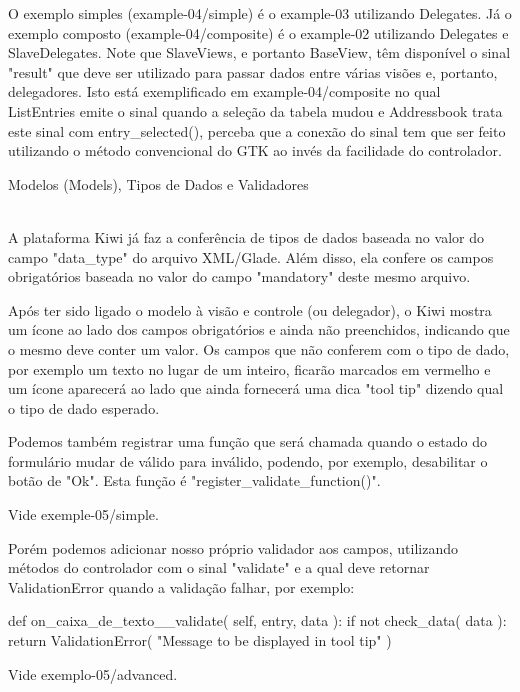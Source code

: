 O exemplo simples (example-04/simple) é o example-03 utilizando
Delegates. Já o exemplo composto (example-04/composite) é o
example-02 utilizando Delegates e SlaveDelegates. Note que SlaveViews,
e portanto BaseView, têm disponível o sinal "result" que deve ser
utilizado para passar dados entre várias visões e, portanto,
delegadores. Isto está exemplificado em example-04/composite no qual
ListEntries emite o sinal quando a seleção da tabela mudou e
Addressbook trata este sinal com entry_selected(), perceba que a
conexão do sinal tem que ser feito utilizando o método convencional do
GTK ao invés da facilidade do controlador.



Modelos (Models), Tipos de Dados e Validadores
~~~~~~~~~~~~~~~~~~~~~~~~~~~~~~~~~~~~~~~~~~~~~~

A plataforma Kiwi já faz a conferência de tipos de dados baseada no
valor do campo "data_type" do arquivo XML/Glade. Além disso, ela
confere os campos obrigatórios baseada no valor do campo "mandatory"
deste mesmo arquivo.

Após ter sido ligado o modelo à visão e controle (ou delegador), o
Kiwi mostra um ícone ao lado dos campos obrigatórios e ainda não
preenchidos, indicando que o mesmo deve conter um valor. Os campos que
não conferem com o tipo de dado, por exemplo um texto no lugar de um
inteiro, ficarão marcados em vermelho e um ícone aparecerá ao lado que
ainda fornecerá uma dica "tool tip" dizendo qual o tipo de dado
esperado.

Podemos também registrar uma função que será chamada quando o estado
do formulário mudar de válido para inválido, podendo, por exemplo,
desabilitar o botão de "Ok". Esta função é
"register_validate_function()".

Vide exemple-05/simple.

Porém podemos adicionar nosso próprio validador aos campos, utilizando
métodos do controlador com o sinal "validate" e a qual deve retornar
ValidationError quando a validação falhar, por exemplo:

   def on_caixa_de_texto__validate( self, entry, data ):
       if not check_data( data ):
          return ValidationError( "Message to be displayed in tool tip" )


Vide exemplo-05/advanced.

